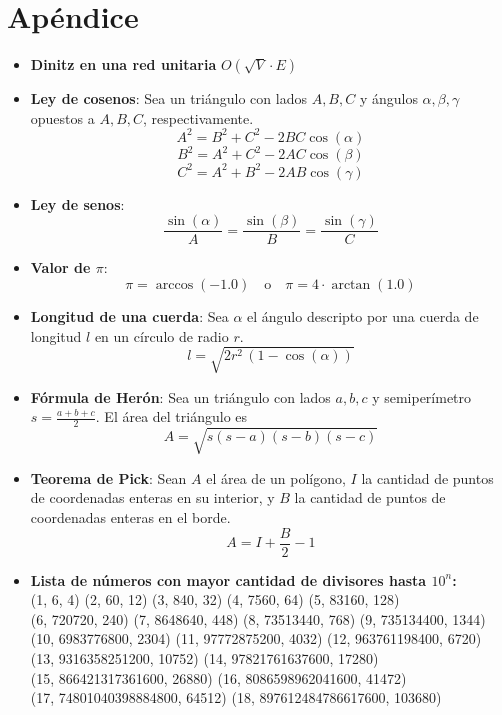 \documentclass[12pt,a4paper]{article}
\begin{document}
\section*{Apéndice} \vspace{1em}

\begin{itemize}
  \item \textbf{Dinitz en una red unitaria} $O(\sqrt{V}\cdot E)$ \\
  \item \textbf{Ley de cosenos}: Sea un triángulo con lados $A, B, C$ y ángulos 
  $\alpha, \beta, \gamma$ opuestos a $A, B, C$, respectivamente.
  \[
    A^2 = B^2 + C^2 - 2BC \cos(\alpha)
  \]
  \[
    B^2 = A^2 + C^2 - 2AC \cos(\beta)
  \]
  \[
    C^2 = A^2 + B^2 - 2AB \cos(\gamma)
  \]

  \item \textbf{Ley de senos}:
  \[
    \frac{\sin(\alpha)}{A} = \frac{\sin(\beta)}{B} = \frac{\sin(\gamma)}{C}
  \]

  \item \textbf{Valor de $\pi$}: 
  \[
    \pi = \arccos(-1.0) \quad \text{o} \quad \pi = 4 \cdot \arctan(1.0)
  \]

  \item \textbf{Longitud de una cuerda}: Sea $\alpha$ el ángulo descripto por una cuerda de longitud $l$ en un círculo de radio $r$.
  \[
    l = \sqrt{2r^2 \, (1 - \cos(\alpha))}
  \]

  \item \textbf{Fórmula de Herón}: Sea un triángulo con lados $a, b, c$ y semiperímetro $s=\tfrac{a+b+c}{2}$. El área del triángulo es
  \[
    A = \sqrt{s(s-a)(s-b)(s-c)}
  \]

  \item \textbf{Teorema de Pick}: Sean $A$ el área de un polígono, $I$ la cantidad de puntos de coordenadas enteras en su interior, y $B$ la cantidad de puntos de coordenadas enteras en el borde.
  \[
    A = I + \frac{B}{2} - 1
  \]
  \item \textbf{Lista de números con mayor cantidad de divisores hasta $10^n$:}\\[0.5em]
  (1, 6, 4) (2, 60, 12) (3, 840, 32) (4, 7560, 64) (5, 83160, 128)\\
  (6, 720720, 240) (7, 8648640, 448) (8, 73513440, 768) (9, 735134400, 1344)\\
  (10, 6983776800, 2304) (11, 97772875200, 4032) (12, 963761198400, 6720)\\
  (13, 9316358251200, 10752) (14, 97821761637600, 17280)\\
  (15, 866421317361600, 26880) (16, 8086598962041600, 41472) \\
  (17, 74801040398884800, 64512) (18, 897612484786617600, 103680)\\

\end{itemize}
\end{document}
